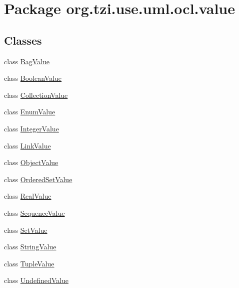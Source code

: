 \hypertarget{namespaceorg_1_1tzi_1_1use_1_1uml_1_1ocl_1_1value}{\section{Package org.\-tzi.\-use.\-uml.\-ocl.\-value}
\label{namespaceorg_1_1tzi_1_1use_1_1uml_1_1ocl_1_1value}
}
\subsection*{Classes}
\begin{DoxyCompactItemize}
\item 
class \hyperlink{classorg_1_1tzi_1_1use_1_1uml_1_1ocl_1_1value_1_1_bag_value}{Bag\-Value}
\item 
class \hyperlink{classorg_1_1tzi_1_1use_1_1uml_1_1ocl_1_1value_1_1_boolean_value}{Boolean\-Value}
\item 
class \hyperlink{classorg_1_1tzi_1_1use_1_1uml_1_1ocl_1_1value_1_1_collection_value}{Collection\-Value}
\item 
class \hyperlink{classorg_1_1tzi_1_1use_1_1uml_1_1ocl_1_1value_1_1_enum_value}{Enum\-Value}
\item 
class \hyperlink{classorg_1_1tzi_1_1use_1_1uml_1_1ocl_1_1value_1_1_integer_value}{Integer\-Value}
\item 
class \hyperlink{classorg_1_1tzi_1_1use_1_1uml_1_1ocl_1_1value_1_1_link_value}{Link\-Value}
\item 
class \hyperlink{classorg_1_1tzi_1_1use_1_1uml_1_1ocl_1_1value_1_1_object_value}{Object\-Value}
\item 
class \hyperlink{classorg_1_1tzi_1_1use_1_1uml_1_1ocl_1_1value_1_1_ordered_set_value}{Ordered\-Set\-Value}
\item 
class \hyperlink{classorg_1_1tzi_1_1use_1_1uml_1_1ocl_1_1value_1_1_real_value}{Real\-Value}
\item 
class \hyperlink{classorg_1_1tzi_1_1use_1_1uml_1_1ocl_1_1value_1_1_sequence_value}{Sequence\-Value}
\item 
class \hyperlink{classorg_1_1tzi_1_1use_1_1uml_1_1ocl_1_1value_1_1_set_value}{Set\-Value}
\item 
class \hyperlink{classorg_1_1tzi_1_1use_1_1uml_1_1ocl_1_1value_1_1_string_value}{String\-Value}
\item 
class \hyperlink{classorg_1_1tzi_1_1use_1_1uml_1_1ocl_1_1value_1_1_tuple_value}{Tuple\-Value}
\item 
class \hyperlink{classorg_1_1tzi_1_1use_1_1uml_1_1ocl_1_1value_1_1_undefined_value}{Undefined\-Value}

\end{DoxyCompactItemize}
